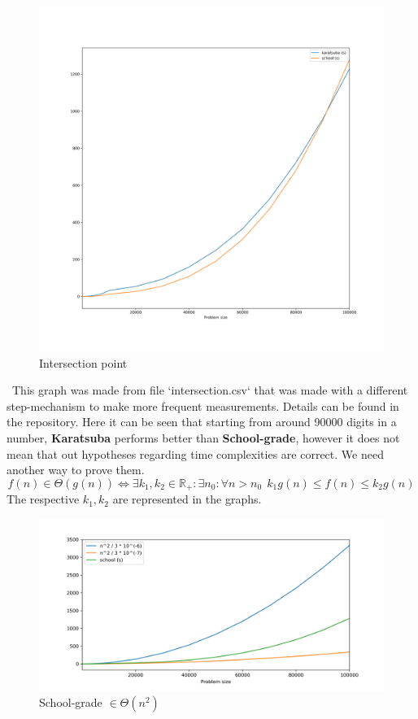 \documentclass[12pt, oneside]{article}
\begin{document}
\begin{figure}[h]
\caption{Intersection point}
\centering
\includegraphics[width=1\textwidth]{intersection_square}
\end{figure}
\
This graph was made from file `intersection.csv` that was made with a different step-mechanism to make more frequent measurements. Details can be found in the repository.
  Here it can be seen that starting from around 90000 digits in a number, \textbf{Karatsuba} performs better than \textbf{School-grade}, however it does not mean that out hypotheses regarding time complexities are correct. We need another way to prove them.
\[f(n) \in \Theta(g(n)) \iff \exists k_1, k_2 \in \mathbb{R}_+:  \exists n_0: \forall n > n_0 \ \ k_1 g(n) \leq f(n) \leq k_2 g(n) \]  
The respective $k_1, k_2$ are represented in the graphs.
  \begin{figure}[h]
\caption{School-grade $\in \Theta(n^2)$}

\includegraphics[width=1\textwidth]{O_school}
\end{figure}
\end{document}
